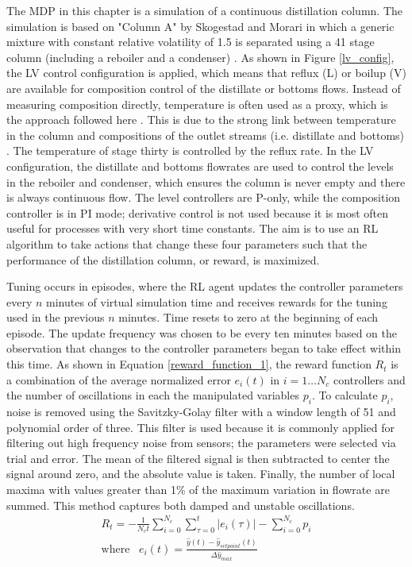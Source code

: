 The MDP in this chapter is a simulation of a continuous  distillation column. The simulation is based on "Column A" by Skogestad and Morari in which a generic mixture with constant relative volatility of 1.5 is separated using a 41 stage column (including a reboiler and a condenser) \cite{Skogestad1988}. As shown in Figure \ref{lv_config}, the LV control configuration is applied, which means that reflux (L) or boilup (V) are available for composition control of the distillate or bottoms flows. Instead of measuring composition directly, temperature is often used as a proxy, which is the approach followed here \cite{Wolff1996, Luyben2006}. This is due to the strong link between temperature in the column and compositions of the outlet streams (i.e. distillate and bottoms) \cite{Luyben2006}. The temperature of stage thirty is controlled by the reflux rate. In the LV configuration, the distillate and bottoms flowrates are used to control the levels in the reboiler and condenser, which ensures the column is never empty and there is always continuous flow.  The level controllers are P-only, while the composition controller is in PI mode; derivative control is not used because it is most often useful for processes with very short time constants. The aim is to use an RL algorithm to take actions that change these four parameters such that the performance of the distillation column, or reward, is maximized.

Tuning occurs in episodes, where the RL agent updates the controller parameters every $n$ minutes of virtual simulation time and receives rewards for the tuning used in the previous $n$ minutes. Time resets to zero at the beginning of each episode. The update frequency was chosen to be every ten minutes based on the observation that changes to the controller parameters began to take effect within this time. As shown in Equation \ref{reward_function_1}, the reward function $R_t$ is a combination of the average normalized error $e_i(t)$ in $i=1 \dots N_c$ controllers and the number of oscillations in each the manipulated variables $p_i$. To calculate $p_i$, noise is removed using the Savitzky-Golay filter with a window length of 51 and polynomial order of three. This filter is used because it is commonly applied for filtering out high frequency noise from sensors; the parameters were selected via trial and error. The mean of the filtered signal is then subtracted to center the signal around zero, and the absolute value is taken. Finally, the number of local maxima with values greater than 1\% of the maximum variation in flowrate are summed. This method captures both damped and unstable oscillations.
\begin{gather}
	\label{reward_function_1}	
 	R_t = - \frac{1}{N_c t}\sum_{i=0}^{N_c}\sum_{\tau=0}^t \lvert e_i(\tau) \rvert  - \sum_{i=0}^{N_c}p_i\\[2em]
 	\label{reward_function_2}	
	\text{where}\;\;\; 	e_i(t) = \frac{\hat y(t) - \hat y_{setpoint}(t)}{\Delta \hat y_{max}}
\end{gather}

